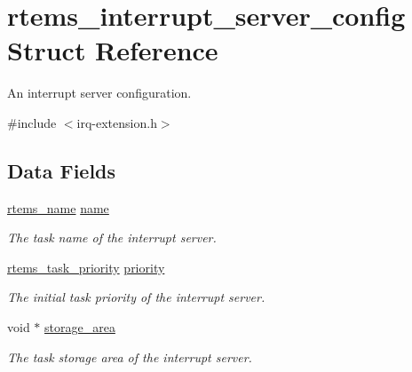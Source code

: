 \hypertarget{structrtems__interrupt__server__config}{}\section{rtems\+\_\+interrupt\+\_\+server\+\_\+config Struct Reference}
\label{structrtems__interrupt__server__config}


An interrupt server configuration.  




{\ttfamily \#include $<$irq-\/extension.\+h$>$}

\subsection*{Data Fields}
\begin{DoxyCompactItemize}
\item 
\mbox{\label{structrtems__interrupt__server__config_a6ba8df73e4dc2f915d77797fdc0e9eea}} 
\mbox{\hyperlink{group__ClassicTasks_ga55fb63c49f68c0cbd9bee004da15b1fd}{rtems\+\_\+name}} \mbox{\hyperlink{structrtems__interrupt__server__config_a6ba8df73e4dc2f915d77797fdc0e9eea}{name}}
\begin{DoxyCompactList}\small\item\em The task name of the interrupt server. \end{DoxyCompactList}\item 
\mbox{\label{structrtems__interrupt__server__config_a78f34418b31b38059436888ccab05b33}} 
\mbox{\hyperlink{group__ClassicTasks_gaa80a0c0938307d1e99d0eb5fee765b47}{rtems\+\_\+task\+\_\+priority}} \mbox{\hyperlink{structrtems__interrupt__server__config_a78f34418b31b38059436888ccab05b33}{priority}}
\begin{DoxyCompactList}\small\item\em The initial task priority of the interrupt server. \end{DoxyCompactList}\item 
void $\ast$ \mbox{\hyperlink{structrtems__interrupt__server__config_aa9ec46bb3b6ae7574579eb07c4c41e60}{storage\+\_\+area}}
\begin{DoxyCompactList}\small\item\em The task storage area of the interrupt server. \end{DoxyCompactList}\item 

\end{DoxyCompactItemize}

